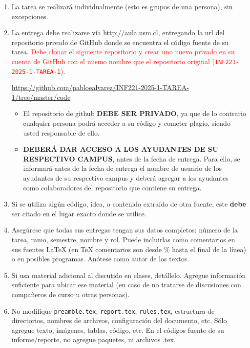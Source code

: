 
  \begin{enumerate}[(1)]
  \item
    La tarea se realizará individualmente
    (esto es grupos de una persona),
    sin excepciones.
  \item
    La entrega debe realizarse vía \url{http://aula.usm.cl}, entregando la url del repositorio privado de GitHub donde se encuentra el código fuente de su tarea. 
    \textcolor{red}{Debe clonar el siguiente repositorio y crear uno nuevo privado en su cuenta de GitHub con el mismo nombre que el repositorio original (\texttt{INF221-2025-1-TAREA-1})}.
    \begin{center}

      \url{https://github.com/pabloealvarez/INF221-2025-1-TAREA-1/tree/master/code}
          
  \end{center}

  \begin{itemize}
      
  \item El repositorio de github \textbf{DEBE SER PRIVADO}, ya que de lo contrario cualquier persona podrá acceder a su código y cometer plagio, siendo usted responsable de ello.
  \item  \textbf{DEBERÁ DAR ACCESO A LOS AYUDANTES DE SU RESPECTIVO CAMPUS}, antes de la fecha de entrega. Para ello, se informará antes de la fecha de entrega el nombre de usuario de los ayudantes de su respectivo campus y deberá agregar a los ayudantes como colaboradores del repositorio que contiene su entrega. 
  \end{itemize}

  \item Si se utiliza algún código, idea, o contenido extraído de otra fuente, este \textbf{debe} ser citado en el lugar exacto donde se utilice. 
  \item
  Asegúrese que todas sus entregas tengan sus datos completos:
  número de la tarea, ramo, semestre, nombre y rol.
  Puede incluirlas como comentarios en sus fuentes \LaTeX{}
  (en \TeX{} comentarios son desde \% hasta el final de la línea)
  o en posibles programas.
  Anótese como autor de los textos.

  \item
    Si usa material adicional al discutido en clases,
    detállelo.
    Agregue información suficiente para ubicar ese material
    (en caso de no tratarse de discusiones con compañeros de curso
     u otras personas).
    \item No modifique \texttt{preamble.tex}, \texttt{report.tex}, \texttt{rules.tex}, estructura de directorios, nombres de archivos, configuración del documento, etc. Sólo agregue texto, imágenes, tablas, código, etc. En el códigos fuente de su informe/reporte, no agregue paquetes, ni archivos .tex.


\end{enumerate}
